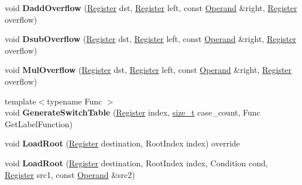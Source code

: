 \begin{DoxyCompactItemize}
void {\bfseries Dadd\+Overflow} (\mbox{\hyperlink{classv8_1_1internal_1_1Register}{Register}} dst, \mbox{\hyperlink{classv8_1_1internal_1_1Register}{Register}} left, const \mbox{\hyperlink{classv8_1_1internal_1_1Operand}{Operand}} \&right, \mbox{\hyperlink{classv8_1_1internal_1_1Register}{Register}} overflow)
\item 
\mbox{\label{classv8_1_1internal_1_1TurboAssembler_a019567df7c980687a31a0102968ac708}} 
void {\bfseries Dsub\+Overflow} (\mbox{\hyperlink{classv8_1_1internal_1_1Register}{Register}} dst, \mbox{\hyperlink{classv8_1_1internal_1_1Register}{Register}} left, const \mbox{\hyperlink{classv8_1_1internal_1_1Operand}{Operand}} \&right, \mbox{\hyperlink{classv8_1_1internal_1_1Register}{Register}} overflow)
\item 
\mbox{\label{classv8_1_1internal_1_1TurboAssembler_a0b3b6c02f6d8712d3d105673a86df808}} 
void {\bfseries Mul\+Overflow} (\mbox{\hyperlink{classv8_1_1internal_1_1Register}{Register}} dst, \mbox{\hyperlink{classv8_1_1internal_1_1Register}{Register}} left, const \mbox{\hyperlink{classv8_1_1internal_1_1Operand}{Operand}} \&right, \mbox{\hyperlink{classv8_1_1internal_1_1Register}{Register}} overflow)
\item 
\mbox{\label{classv8_1_1internal_1_1TurboAssembler_a8b7e7d1ca04f249819888b32d52477fa}} 
{\footnotesize template$<$typename Func $>$ }\\void {\bfseries Generate\+Switch\+Table} (\mbox{\hyperlink{classv8_1_1internal_1_1Register}{Register}} index, \mbox{\hyperlink{classsize__t}{size\+\_\+t}} case\+\_\+count, Func Get\+Label\+Function)
\item 
\mbox{\label{classv8_1_1internal_1_1TurboAssembler_a931af7443ae4f741ae52403554cca319}} 
void {\bfseries Load\+Root} (\mbox{\hyperlink{classv8_1_1internal_1_1Register}{Register}} destination, Root\+Index index) override
\item 
\mbox{\label{classv8_1_1internal_1_1TurboAssembler_a363087718f21ea12943c36ba85c4d698}} 
void {\bfseries Load\+Root} (\mbox{\hyperlink{classv8_1_1internal_1_1Register}{Register}} destination, Root\+Index index, Condition cond, \mbox{\hyperlink{classv8_1_1internal_1_1Register}{Register}} src1, const \mbox{\hyperlink{classv8_1_1internal_1_1Operand}{Operand}} \&src2)

\end{DoxyCompactItemize}
